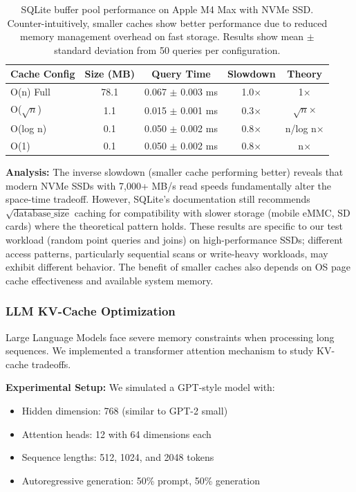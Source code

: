 \documentclass[11pt]{article}
\theoremstyle{definition}
\begin{document}
\begin{table}[ht]
\centering
\begin{tabular}{lcccc}
\toprule
Cache Config & Size (MB) & Query Time & Slowdown & Theory \\
\midrule
O(n) Full & 78.1 & 0.067 $\pm$ 0.003 ms & 1.0× & 1× \\
O($\sqrt{n}$) & 1.1 & 0.015 $\pm$ 0.001 ms & 0.3× & $\sqrt{n}$× \\
O(log n) & 0.1 & 0.050 $\pm$ 0.002 ms & 0.8× & n/log n× \\
O(1) & 0.1 & 0.050 $\pm$ 0.002 ms & 0.8× & n× \\
\bottomrule
\end{tabular}
\caption{SQLite buffer pool performance on Apple M4 Max with NVMe SSD. Counter-intuitively, smaller caches show better performance due to reduced memory management overhead on fast storage. Results show mean $\pm$ standard deviation from 50 queries per configuration.}
\label{tab:sqlite}
\end{table}

\textbf{Analysis:} The inverse slowdown (smaller cache performing better) reveals that modern NVMe SSDs with 7,000+ MB/s read speeds fundamentally alter the space-time tradeoff. However, SQLite's documentation still recommends $\sqrt{\text{database\_size}}$ caching for compatibility with slower storage (mobile eMMC, SD cards) where the theoretical pattern holds. These results are specific to our test workload (random point queries and joins) on high-performance SSDs; different access patterns, particularly sequential scans or write-heavy workloads, may exhibit different behavior. The benefit of smaller caches also depends on OS page cache effectiveness and available system memory.

\subsubsection{LLM KV-Cache Optimization}

Large Language Models face severe memory constraints when processing long sequences. We implemented a transformer attention mechanism to study KV-cache tradeoffs.

\textbf{Experimental Setup:} We simulated a GPT-style model with:
\begin{itemize}
\item Hidden dimension: 768 (similar to GPT-2 small)
\item Attention heads: 12 with 64 dimensions each
\item Sequence lengths: 512, 1024, and 2048 tokens
\item Autoregressive generation: 50\% prompt, 50\% generation
\end{itemize}
\end{document}
